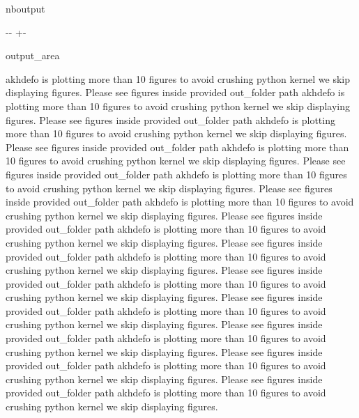 \documentclass[letterpaper,10pt]{sphinxmanual}
\newlength\nbsphinxcodecellspacing
\begin{document}
\begin{sphinxuseclass}{nboutput}
{

\kern-\sphinxverbatimsmallskipamount\kern-\baselineskip
\kern+\FrameHeightAdjust\kern-\fboxrule
\vspace{\nbsphinxcodecellspacing}

\begin{sphinxuseclass}{output_area}
\begin{sphinxuseclass}{}


\begin{sphinxVerbatim}[commandchars=\\\{\}]
akhdefo is plotting more than 10 figures to avoid crushing python kernel we skip displaying figures.
 Please see figures inside provided out\_folder path
akhdefo is plotting more than 10 figures to avoid crushing python kernel we skip displaying figures.
 Please see figures inside provided out\_folder path
akhdefo is plotting more than 10 figures to avoid crushing python kernel we skip displaying figures.
 Please see figures inside provided out\_folder path
akhdefo is plotting more than 10 figures to avoid crushing python kernel we skip displaying figures.
 Please see figures inside provided out\_folder path
akhdefo is plotting more than 10 figures to avoid crushing python kernel we skip displaying figures.
 Please see figures inside provided out\_folder path
akhdefo is plotting more than 10 figures to avoid crushing python kernel we skip displaying figures.
 Please see figures inside provided out\_folder path
akhdefo is plotting more than 10 figures to avoid crushing python kernel we skip displaying figures.
 Please see figures inside provided out\_folder path
akhdefo is plotting more than 10 figures to avoid crushing python kernel we skip displaying figures.
 Please see figures inside provided out\_folder path
akhdefo is plotting more than 10 figures to avoid crushing python kernel we skip displaying figures.
 Please see figures inside provided out\_folder path
akhdefo is plotting more than 10 figures to avoid crushing python kernel we skip displaying figures.
 Please see figures inside provided out\_folder path
akhdefo is plotting more than 10 figures to avoid crushing python kernel we skip displaying figures.
 Please see figures inside provided out\_folder path
akhdefo is plotting more than 10 figures to avoid crushing python kernel we skip displaying figures.
 Please see figures inside provided out\_folder path
akhdefo is plotting more than 10 figures to avoid crushing python kernel we skip displaying figures.

\end{sphinxVerbatim}
\end{sphinxuseclass}
\end{sphinxuseclass}}
\end{sphinxuseclass}
\end{document}
